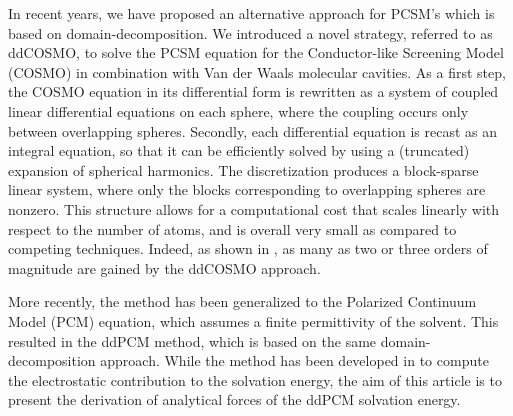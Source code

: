In recent years, we have proposed an alternative approach for PCSM's which is based on  domain-decomposition. We introduced a novel strategy\cite{Cances_JCP_ddCOSMO}, referred to as ddCOSMO\cite{Cances_JCP_ddCOSMO,Lipparini_JCTC_ddCOSMO,Lipparini_JPCL_ddCOSMO,Lipparini_JCP_ddCOSMO-QM}, to solve the PCSM equation for the Conductor-like Screening Model\cite{Klamt_JCS_Cosmo} (COSMO) in combination with Van der Waals molecular cavities. 
As a first step, the COSMO equation in its differential form is rewritten as a system of coupled linear differential equations on each sphere, where the coupling occurs only between overlapping spheres. Secondly, each differential equation is recast as an integral equation, so that it can be efficiently solved by using a (truncated) expansion of spherical harmonics\cite{Cances_JCP_ddCOSMO}. The discretization produces a block-sparse linear system\cite{Lipparini_JCTC_ddCOSMO}, where only the blocks corresponding to overlapping spheres are nonzero. This structure allows for a computational cost that scales linearly with respect to the number of atoms, and is overall very small as compared to competing techniques. Indeed, as shown in \cite{Lipparini_JPCL_ddCOSMO}, as many as two or three orders of magnitude are gained by the ddCOSMO approach.

More recently, the method has been generalized to the Polarized Continuum Model (PCM) equation, which assumes a finite permittivity of the solvent. This resulted in the ddPCM method\cite{Stamm_JCP_DDPCM}, which is based on the same domain-decomposition approach. 
While the method has been developed in \cite{Stamm_JCP_DDPCM} to compute the electrostatic contribution to the solvation energy, the aim of this article is to present the derivation of analytical forces of the ddPCM solvation energy.

